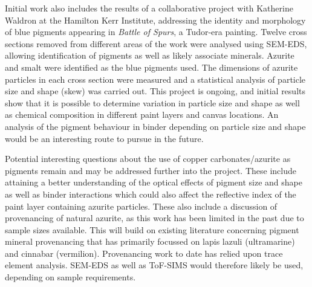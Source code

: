 Initial work also includes the results of a collaborative project with Katherine Waldron at the Hamilton Kerr Institute, addressing the identity and morphology of blue pigments appearing in \textit{Battle of Spurs}, a Tudor-era painting. Twelve cross sections removed from different areas of the work were analysed using SEM-EDS, allowing identification of pigments as well as likely associate minerals. Azurite and smalt were identified as the blue pigments used. The dimensions of azurite particles in each cross section were measured and a statistical analysis of particle size and shape (skew) was carried out. This project is ongoing, and initial results show that it is possible to determine variation in particle size and shape as well as chemical composition in different paint layers and canvas locations. An analysis of the pigment behaviour in binder depending on particle size and shape would be an interesting route to pursue in the future. 

Potential interesting questions about the use of copper carbonates/azurite as pigments remain and may be addressed further into the project. These include attaining a better understanding of the optical effects of pigment size and shape as well as binder interactions which could also affect the reflective index of the paint layer containing azurite particles. These also include a discussion of provenancing of natural azurite, as this work has been limited in the past due to sample sizes available. This will build on existing literature concerning pigment mineral provenancing that has primarily focussed on lapis lazuli (ultramarine) and cinnabar (vermilion). Provenancing work to date has relied upon trace element analysis. SEM-EDS as well as ToF-SIMS would therefore likely be used, depending on sample requirements. 